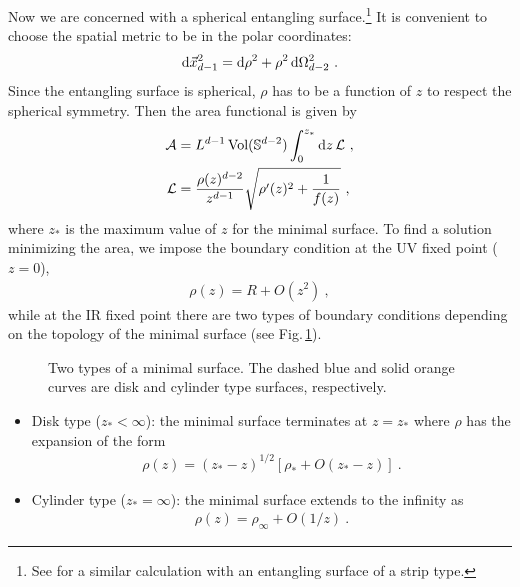 Now we are concerned with a spherical entangling surface.\footnote{See \textcite{Myers:2012ed} for a similar calculation with an entangling surface of a strip type.}
It is convenient to choose the spatial metric to be in the polar coordinates:
\begin{align}
\mathrm{d}{\vec x}_{d-1}^2 = \mathrm{d}\rho^2 + \rho^2\, \mathrm{d}\Omega_{d-2}^2 \ .
\end{align}
Since the entangling surface is spherical, $\rho$ has to be a function of $z$ to respect the spherical symmetry.
Then the area functional is given by
\begin{align}\label{AreaFunctionalSphere}
\begin{aligned}
{\cal A} &= L^{d-1}\,\text{Vol}(\mathbb{S}^{d-2})\int_0^{z_\ast} \mathrm{d} z\, {\cal L}\ ,\\
{\cal L} &= \frac{\rho(z)^{d-2}}{z^{d-1}}\sqrt{\rho'(z)^2 + \frac{1}{f(z)}} \ ,
\end{aligned}
\end{align}
where $z_\ast$ is the maximum value of $z$ for the minimal surface.
To find a solution minimizing the area, we impose the boundary condition at the UV fixed point ($z=0$),
\begin{align}
\rho(z) = R + O(z^2) \ ,
\end{align}
while at the IR fixed point there are two types of boundary conditions depending on the topology of the minimal surface (see Fig.\,\ref{fig:Topology}).
\begin{figure}[htbp]
\centering
{}

\caption{Two types of a minimal surface. The dashed blue and solid orange curves are disk and cylinder type surfaces, respectively.}
\label{fig:Topology}
\end{figure}
\begin{itemize}
\item
Disk type ($z_\ast < \infty$): 
the minimal surface terminates at $z=z_\ast$ where $\rho$ has the expansion of the form
\begin{align}
\rho(z) =  (z_\ast - z)^{1/2}\left[\rho_\ast + O (z_\ast - z) \right]\ .
\end{align}
\item
Cylinder type ($z_\ast = \infty$):
the minimal surface extends to the infinity as 
\begin{align}
\rho(z) = \rho_\infty + O(1/z) \ .
\end{align}
\end{itemize}
